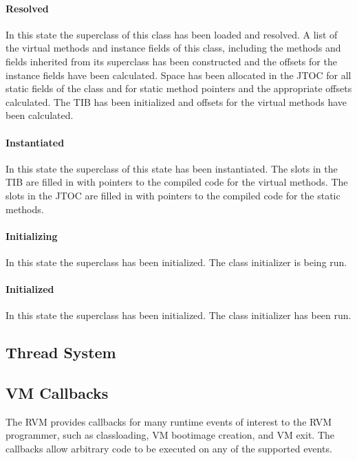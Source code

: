 \paragraph{Resolved}
In this state the superclass of this class has been loaded and resolved. 
A list of the virtual methods and instance fields of this class, including the 
methods and fields
inherited from its superclass has been constructed and the offsets for the 
instance fields have been calculated.  
Space has been allocated in the JTOC for all static fields of the class and for
static method pointers and the appropriate offsets calculated.
The TIB has been initialized and offsets for the virtual methods have been
calculated.

\paragraph{Instantiated}
In this state the superclass of this state has been instantiated. 
The slots in the TIB are filled in with pointers to the compiled code for the 
virtual methods. 
The slots in the JTOC are filled in with pointers to the compiled code for the 
static methods.

\paragraph{Initializing} 
In this state the superclass has been initialized. The class
initializer is being run. 

\paragraph{Initialized} 
In this state the superclass has been initialized. The class initializer has 
been run. 

\JavaTMFooter

\subsection{Thread System}\label{sec:threads}



\subsection{VM Callbacks}\label{sssec:callbacks}

The RVM provides callbacks for many runtime events of interest to the RVM
programmer, such as classloading, VM bootimage creation, and VM exit.  The
callbacks allow arbitrary code to be executed on any of the supported events.

